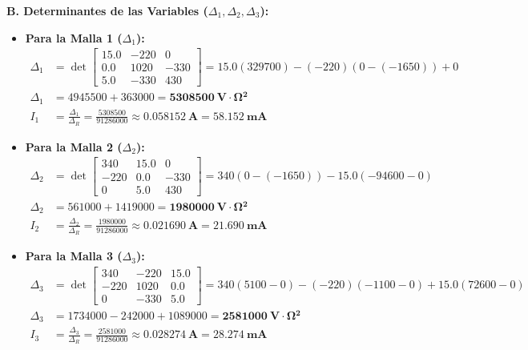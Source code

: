 \documentclass[11pt, a4paper]{article}
\begin{document}
\vspace{0.2cm}
\textbf{B. Determinantes de las Variables ($\Delta_1, \Delta_2, \Delta_3$):}
\begin{itemize}
    \item \textbf{Para la Malla 1 ($\Delta_1$):}
    \begin{align*}
        \Delta_1 &= \det \begin{bmatrix} 15.0 & -220 & 0 \\ 0.0 & 1020 & -330 \\ 5.0 & -330 & 430 \end{bmatrix} = 15.0(329700) - (-220)(0 - (-1650)) + 0 \\
        \Delta_1 &= 4945500 + 363000 = \mathbf{\qty{5308500}{\volt\cdot\ohm^2}} \\
        I_1 &= \frac{\Delta_1}{\Delta_R} = \frac{5308500}{91286000} \approx \mathbf{\qty{0.058152}{\ampere} = \qty{58.152}{\milli\ampere}}
    \end{align*}
    \item \textbf{Para la Malla 2 ($\Delta_2$):}
    \begin{align*}
        \Delta_2 &= \det \begin{bmatrix} 340 & 15.0 & 0 \\ -220 & 0.0 & -330 \\ 0 & 5.0 & 430 \end{bmatrix} = 340(0 - (-1650)) - 15.0(-94600 - 0) \\
        \Delta_2 &= 561000 + 1419000 = \mathbf{\qty{1980000}{\volt\cdot\ohm^2}} \\
        I_2 &= \frac{\Delta_2}{\Delta_R} = \frac{1980000}{91286000} \approx \mathbf{\qty{0.021690}{\ampere} = \qty{21.690}{\milli\ampere}}
    \end{align*}
    \item \textbf{Para la Malla 3 ($\Delta_3$):}
    \begin{align*}
        \Delta_3 &= \det \begin{bmatrix} 340 & -220 & 15.0 \\ -220 & 1020 & 0.0 \\ 0 & -330 & 5.0 \end{bmatrix} = 340(5100 - 0) - (-220)(-1100 - 0) + 15.0(72600 - 0) \\
        \Delta_3 &= 1734000 - 242000 + 1089000 = \mathbf{\qty{2581000}{\volt\cdot\ohm^2}} \\
        I_3 &= \frac{\Delta_3}{\Delta_R} = \frac{2581000}{91286000} \approx \mathbf{\qty{0.028274}{\ampere} = \qty{28.274}{\milli\ampere}}
    \end{align*}
\end{itemize}
\end{document}
